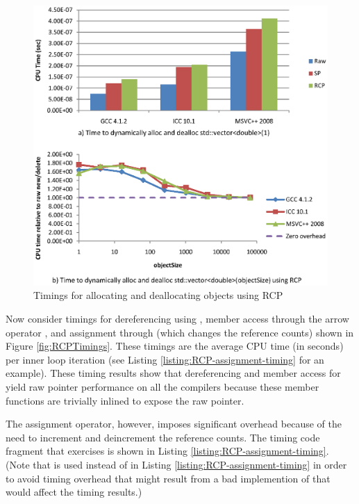 \documentclass[pdf,ps2pdf,11pt]{SANDreport}
\begin{document}
{\bsinglespace
\begin{figure}
\begin{center}
\includegraphics*[angle=0,scale=1.00]{RCPAllocTimings}
\end{center}
\caption{
\label{fig:RCPAllocTimings}
Timings for allocating and deallocating objects using RCP}
\end{figure}
\esinglespace}


Now consider timings for dereferencing using {},
member access through the arrow operator {},
and assignment through {} (which changes the
reference counts) shown in Figure {}\ref{fig:RCPTimings}.  These
timings are the average CPU time (in seconds) per inner loop iteration
(see Listing {}\ref{listing:RCP-assignment-timing} for an example).
These timing results show that dereferencing and member access for
{} yield raw pointer performance on all the compilers because
these member functions are trivially inlined to expose the raw
pointer.

The assignment operator, however, imposes significant overhead because
of the need to increment and deincrement the reference counts.  The
timing code fragment that exercises {} is
shown in Listing {}\ref{listing:RCP-assignment-timing}.  (Note that
{} is used instead of {} in Listing
{}\ref{listing:RCP-assignment-timing} in order to avoid timing
overhead that might result from a bad implemention of
{} that would affect the timing results.)
\end{document}
